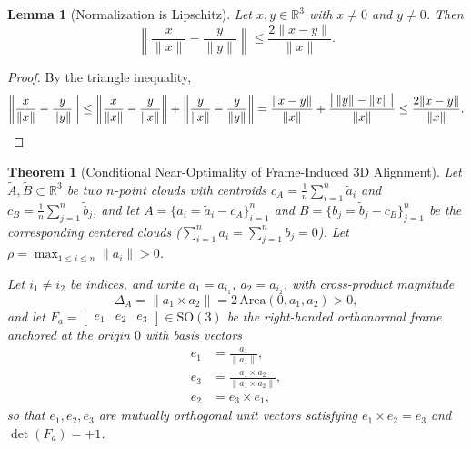 \documentclass[11pt]{article}
\newtheorem{thm}{Theorem}
\newtheorem{lem}{Lemma}
\begin{document}
\begin{lem}[Normalization is Lipschitz]\label{lem:unit}
Let $x, y \in \mathbb{R}^3$ with $x \neq 0$ and $y \neq 0$. Then
\[
\left\|\frac{x}{\|x\|} - \frac{y}{\|y\|}\right\| \le \frac{2\|x - y\|}{\|x\|}.
\]
\end{lem}

\begin{proof}
By the triangle inequality,
\[
\left\|\frac{x}{\|x\|} - \frac{y}{\|y\|}\right\|
\le \left\|\frac{x}{\|x\|} - \frac{y}{\|x\|}\right\| + \left\|\frac{y}{\|x\|} - \frac{y}{\|y\|}\right\|
= \frac{\|x - y\|}{\|x\|} + \frac{\bigl|\,\|y\| - \|x\|\,\bigr|}{\|x\|}
\le \frac{2\|x - y\|}{\|x\|}. \qedhere
\]
\end{proof}

\begin{thm}[Conditional Near-Optimality of Frame-Induced 3D Alignment]
\label{thm:frame_induced_3d_alignment}
Let $\tilde{A}, \tilde{B} \subset \mathbb{R}^3$ be two $n$-point clouds with centroids $c_A = \frac{1}{n}\sum_{i=1}^n \tilde{a}_i$ and $c_B = \frac{1}{n}\sum_{j=1}^n \tilde{b}_j$, and let $A = \{a_i = \tilde{a}_i - c_A\}_{i=1}^n$ and $B = \{b_j = \tilde{b}_j - c_B\}_{j=1}^n$ be the corresponding centered clouds ($\sum_{i=1}^n a_i = \sum_{j=1}^n b_j = 0$). Let $\rho = \max_{1 \le i \le n} \|a_i\| > 0$.

Let $i_1 \neq i_2$ be indices, and write $a_1 = a_{i_1}$, $a_2 = a_{i_2}$, with cross-product magnitude
\[
\Delta_A = \|a_1 \times a_2\| = 2\,\mathrm{Area}(0, a_1, a_2) > 0,
\]
and let $F_a = \begin{bmatrix} e_1 & e_2 & e_3 \end{bmatrix} \in \mathrm{SO}(3)$ be the right-handed orthonormal frame anchored at the origin $0$ with basis vectors
\begin{align*}
e_1 &= \frac{a_1}{\|a_1\|}, \\
e_3 &= \frac{a_1 \times a_2}{\|a_1 \times a_2\|}, \\
e_2 &= e_3 \times e_1,
\end{align*}
so that $e_1, e_2, e_3$ are mutually orthogonal unit vectors satisfying $e_1 \times e_2 = e_3$ and $\det(F_a) = +1$.


\end{thm}
\end{document}
